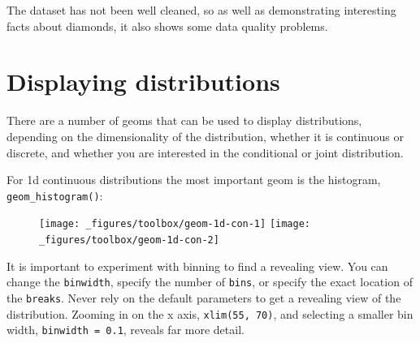 The dataset has not been well cleaned, so as well as demonstrating
interesting facts about diamonds, it also shows some data quality
problems.

\hypertarget{sec:distributions}{\section{Displaying
distributions}\label{sec:distributions}}

There are a number of geoms that can be used to display distributions,
depending on the dimensionality of the distribution, whether it is
continuous or discrete, and whether you are interested in the
conditional or joint distribution. 

For 1d continuous distributions the most important geom is the
histogram, \texttt{geom\_histogram()}: 

\begin{Shaded}
\begin{Highlighting}[]
\StringTok{ }
\StringTok{  }\NormalTok{()}
\StringTok{ }
\StringTok{  }\NormalTok{(} \NormalTok{) +}\StringTok{ }
\StringTok{  }\NormalTok{(}\NormalTok{, }\NormalTok{)}
\end{Highlighting}
\end{Shaded}

\begin{figure}[H]
  \texttt{[image: \_figures/toolbox/geom-1d-con-1]}%
  \texttt{[image: \_figures/toolbox/geom-1d-con-2]}
\end{figure}

It is important to experiment with binning to find a revealing view. You
can change the \texttt{binwidth}, specify the number of \texttt{bins},
or specify the exact location of the \texttt{breaks}. Never rely on the
default parameters to get a revealing view of the distribution. Zooming
in on the x axis, \texttt{xlim(55,\ 70)}, and selecting a smaller bin
width, \texttt{binwidth\ =\ 0.1}, reveals far more detail.

